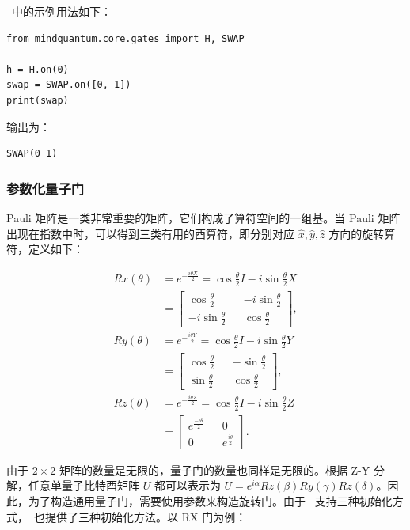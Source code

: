 \MindQuantum\ 中的示例用法如下：
\begin{lstlisting}
from mindquantum.core.gates import H, SWAP

h = H.on(0)
swap = SWAP.on([0, 1])
print(swap)
\end{lstlisting}
输出为：
\begin{lstlisting}
SWAP(0 1)
\end{lstlisting}

\subsubsection{参数化量子门}
Pauli 矩阵是一类非常重要的矩阵，它们构成了算符空间的一组基。当 Pauli 矩阵出现在指数中时，可以得到三类有用的酉算符，即分别对应 $\hat{x}, \hat{y}, \hat{z}$ 方向的旋转算符，定义如下：

\begin{align*}
    Rx(\theta) & =
    e^{-\frac{i\theta X}{2}}=
    \cos{\frac{\theta}{2}}I-i\sin{\frac{\theta}{2}}X \\
               & =\begin{bmatrix}
        \cos{\frac{\theta}{2}}   &  & -i\sin{\frac{\theta}{2}} \\
        -i\sin{\frac{\theta}{2}} &  & \cos{\frac{\theta}{2}}
    \end{bmatrix},        \\
    Ry(\theta) & =
    e^{-\frac{i\theta Y}{2}}=
    \cos{\frac{\theta}{2}}I-i\sin{\frac{\theta}{2}}Y \\
               & =    \begin{bmatrix}
        \cos{\frac{\theta}{2}} &  & -\sin{\frac{\theta}{2}} \\
        \sin{\frac{\theta}{2}} &  & \cos{\frac{\theta}{2}}
    \end{bmatrix},    \\
    Rz(\theta) & =
    e^{-\frac{i\theta Z}{2}}=
    \cos{\frac{\theta}{2}}I-i\sin{\frac{\theta}{2}}Z \\
               & =    \begin{bmatrix}
        e^{\frac{-i\theta}{2}} &  & 0                     \\
        0                      &  & e^{\frac{i\theta}{2}}
    \end{bmatrix}.
\end{align*}


由于 $2\times2$ 矩阵的数量是无限的，量子门的数量也同样是无限的。根据 Z-Y 分解，任意单量子比特酉矩阵 $U$ 都可以表示为 $U=e^{i\alpha}Rz(\beta)Ry(\gamma)Rz(\delta)$。因此，为了构造通用量子门，需要使用参数来构造旋转门。由于 \ParameterResolver\ 支持三种初始化方式，\MindQuantum\ 也提供了三种初始化方法。以 RX 门为例：


